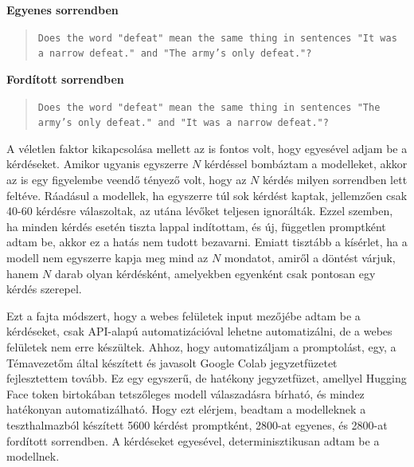 \documentclass[12pt]{report}
\theoremstyle{definition}
\begin{document}
{\bf Egyenes sorrendben}
\begin{quote}
	\texttt{Does the word "defeat" mean the same thing in sentences "It was a narrow defeat." and "The army's only defeat."?}
\end{quote}

{\bf Fordított sorrendben}
\begin{quote}
	\texttt{Does the word "defeat" mean the same thing in sentences "The army's only defeat." and "It was a narrow defeat."?}
\end{quote}

A véletlen faktor kikapcsolása mellett az is fontos volt, hogy egyesével adjam be a kérdéseket. Amikor ugyanis egyszerre $N$ kérdéssel bombáztam a modelleket, akkor az is egy figyelembe veendő tényező volt, hogy az $N$ kérdés milyen sorrendben lett feltéve. Ráadásul a modellek, ha egyszerre túl sok kérdést kaptak, jellemzően csak 40-60 kérdésre válaszoltak, az utána lévőket teljesen ignorálták. Ezzel szemben, ha minden kérdés esetén tiszta lappal indítottam, és új, független promptként adtam be, akkor ez a hatás nem tudott bezavarni. Emiatt tisztább a kísérlet, ha a modell nem egyszerre kapja meg mind az $N$ mondatot, amiről a döntést várjuk, hanem $N$ darab olyan kérdésként, amelyekben egyenként csak pontosan egy kérdés szerepel.

Ezt a fajta módszert, hogy a webes felületek input mezőjébe adtam be a kérdéseket, csak API-alapú automatizációval lehetne automatizálni, de a webes felületek nem erre készültek. Ahhoz, hogy automatizáljam a promptolást, egy, a Témavezetőm által készített és javasolt Google Colab jegyzetfüzetet~\cite{berend2025phi} fejlesztettem tovább. Ez egy egyszerű, de hatékony jegyzetfüzet, amellyel Hugging Face token birtokában tetszőleges modell válaszadásra bírható, és mindez hatékonyan automatizálható. Hogy ezt elérjem, beadtam a modelleknek a teszthalmazból készített 5600 kérdést promptként, 2800-at egyenes, és 2800-at fordított sorrendben. A kérdéseket egyesével, determinisztikusan adtam be a modellnek.


\end{document}
